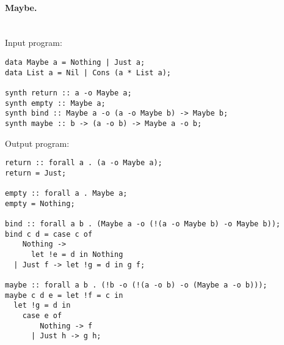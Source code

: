\documentclass{llncs}
\newcommand{\mypara}[1]{\paragraph{\textbf{#1}.}}
\begin{document}
\mypara{Maybe}\
\\
Input program:
\begin{verbatim}
data Maybe a = Nothing | Just a;
data List a = Nil | Cons (a * List a);

synth return :: a -o Maybe a;
synth empty :: Maybe a;
synth bind :: Maybe a -o (a -o Maybe b) -> Maybe b;
synth maybe :: b -> (a -o b) -> Maybe a -o b;
\end{verbatim}
Output program:
\begin{verbatim}
return :: forall a . (a -o Maybe a);
return = Just;

empty :: forall a . Maybe a;
empty = Nothing;

bind :: forall a b . (Maybe a -o (!(a -o Maybe b) -o Maybe b));
bind c d = case c of
    Nothing ->
      let !e = d in Nothing
  | Just f -> let !g = d in g f;

maybe :: forall a b . (!b -o (!(a -o b) -o (Maybe a -o b)));
maybe c d e = let !f = c in
  let !g = d in
    case e of
        Nothing -> f
      | Just h -> g h;
\end{verbatim}
\end{document}
